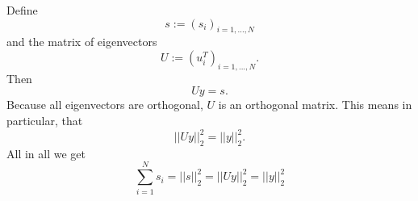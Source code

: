 \documentclass[a4paper]{article}
\newcommand{\1}{\mathds{1}}
\begin{document}
Define \[ s:=(s_i)_{i=1,...,N}\] and the matrix of eigenvectors \[ U:=(u^T_i)_{i=1,...,N}. \]
Then \[ Uy=s. \]
Because all eigenvectors are orthogonal, $U$ is an orthogonal matrix. This means in particular, that \[||Uy||^2_2=||y||^2_2. \] 
All in all we get \[ \sum_{i=1}^{N}s_i=||s||^2_2=||Uy||^2_2=||y||^2_2 \]
\end{document}
